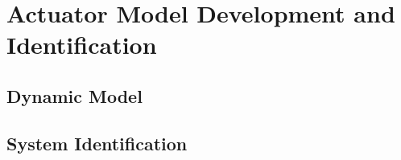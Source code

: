 \chapter{Actuator Model Development and Identification}

\section{Dynamic Model}

\section{System Identification}

